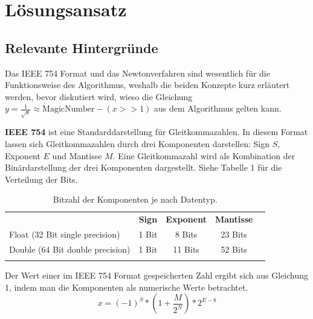 \documentclass[course=erap]{aspdoc}
\begin{document}
%
\section{Lösungsansatz}
\subsection{Relevante Hintergründe}
Das IEEE 754 Format und das Newtonverfahren sind wesentlich für die Funktionsweise des Algorithmus, weshalb die beiden Konzepte kurz erläutert werden, bevor diskutiert wird, wieso die Gleichung \(y = \frac{1}{\sqrt{x}} \approx \text{MagicNumber} - (x >> 1)\) aus dem Algorithmus gelten kann.\par
\textbf{IEEE 754} ist eine Standarddarstellung für Gleitkommazahlen. In diesem Format lassen sich Gleitkommazahlen durch drei Komponenten darstellen: Sign \(S\), Exponent \(E\) und Mantisse \(M\). Eine Gleitkommazahl wird als Kombination der Binärdarstellung der drei Komponenten dargestellt. Siehe Tabelle 1 für die Verteilung der Bits.
\begin{table}[ht]
\centering
\begin{tabular}{lcccl}
\cline{2-4}
\multicolumn{1}{c|}{}                                 & \multicolumn{1}{c|}{\textbf{Sign}}  & \multicolumn{1}{c|}{\textbf{Exponent}} & \multicolumn{1}{c|}{\textbf{Mantisse}} &  \\ \cline{2-4}
\multicolumn{1}{l|}{Float (32 Bit single precision)}  & \multicolumn{1}{c|}{1 Bit} & \multicolumn{1}{c|}{8 Bits}   & \multicolumn{1}{c|}{23 Bits}  &  \\ \cline{2-4}
\multicolumn{1}{l|}{Double (64 Bit double precision)} & \multicolumn{1}{c|}{1 Bit} & \multicolumn{1}{c|}{11 Bits}  & \multicolumn{1}{c|}{52 Bits}  &  \\ \cline{2-4}
                                                      & \multicolumn{1}{l}{}       & \multicolumn{1}{l}{}          & \multicolumn{1}{l}{}          & 
\end{tabular}
\caption{Bitzahl der Komponenten je nach Datentyp.}
\label{tab:captionIEEE}
\end{table}
Der Wert einer im IEEE 754 Format gespeicherten Zahl ergibt sich aus Gleichung 1, indem man die Komponenten als numerische Werte betrachtet.
\begin{equation}
    x = (-1)^S*\left(1+\frac{M}{2^N}\right)*2^{E-b}
\end{equation}
\end{document}
